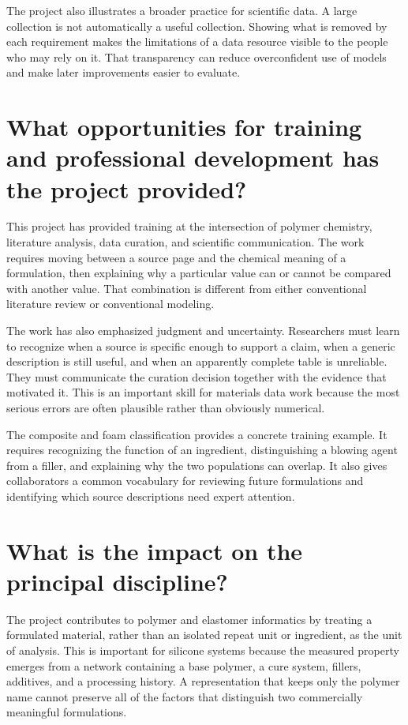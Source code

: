 \documentclass[10pt]{article}
\begin{document}
The project also illustrates a broader practice for scientific data. A large
collection is not automatically a useful collection. Showing what is removed
by each requirement makes the limitations of a data resource visible to the
people who may rely on it. That transparency can reduce overconfident use of
models and make later improvements easier to evaluate.

\section{What opportunities for training and professional development has the project provided?}
This project has provided training at the intersection of polymer chemistry,
literature analysis, data curation, and scientific communication. The work
requires moving between a source page and the chemical meaning of a
formulation, then explaining why a particular value can or cannot be compared
with another value. That combination is different from either conventional
literature review or conventional modeling.

The work has also emphasized judgment and uncertainty. Researchers must learn
to recognize when a source is specific enough to support a claim, when a
generic description is still useful, and when an apparently complete table is
unreliable. They must communicate the curation decision together with the
evidence that motivated it. This is an important skill
for materials data work because the most serious errors are often plausible
rather than obviously numerical.

The composite and foam classification provides a concrete training example.
It requires recognizing the function of an ingredient, distinguishing a
blowing agent from a filler, and explaining why the two populations can
overlap. It also gives collaborators a common vocabulary for reviewing future
formulations and identifying which source descriptions need expert attention.

\section{What is the impact on the principal discipline?}
The project contributes to polymer and elastomer informatics by treating a
formulated material, rather than an isolated repeat unit or ingredient, as the
unit of analysis. This is important for silicone systems because the measured
property emerges from a network containing a base polymer, a cure system,
fillers, additives, and a processing history. A representation that keeps only
the polymer name cannot preserve all of the factors that distinguish two
commercially meaningful formulations.
\end{document}
